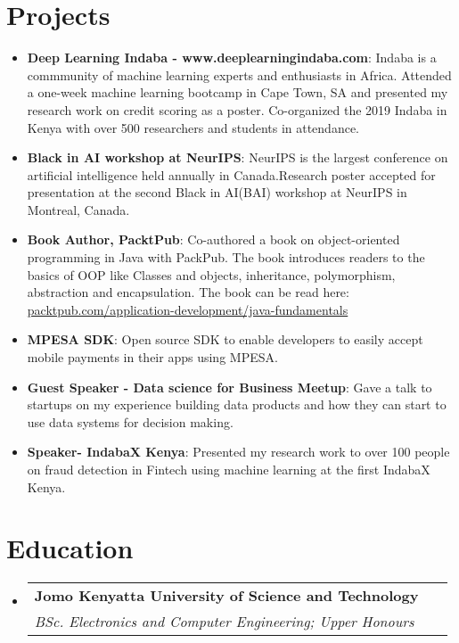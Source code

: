 \documentclass[letterpaper,11pt]{article}
\makeatletter
\newcommand{\resumeItem}[2]{
  \item\small{
    \textbf{#1}{: #2 \vspace{-2pt}}
  }
}
\newcommand{\resumeSubheading}[4]{
  \vspace{-1pt}\item
    \begin{tabular*}{0.97\textwidth}{l@{\extracolsep{\fill}}r}
      \textbf{#1} & #2 \\
      \textit{\small#3} & \textit{\small #4} \\
    \end{tabular*}\vspace{-5pt}
}
\newcommand{\resumeSubItem}[2]{\resumeItem{#1}{#2}\vspace{-4pt}}
\newcommand{\resumeSubHeadingListStart}{\begin{itemize}[leftmargin=*]}
\newcommand{\resumeSubHeadingListEnd}{\end{itemize}}
\makeatother
\begin{document}
\section{Projects}
  \resumeSubHeadingListStart
  	\resumeSubItem{Deep Learning Indaba - www.deeplearningindaba.com}
      {Indaba is a commmunity of machine learning experts and enthusiasts in Africa. Attended a one-week machine learning bootcamp in Cape Town, SA and presented my research work on credit scoring as a poster. Co-organized the 2019 Indaba in Kenya with over 500 researchers and students in attendance.}
  	\resumeSubItem{Black in AI workshop at NeurIPS}
      {NeurIPS is the largest conference on artificial intelligence held annually in Canada.Research poster accepted for presentation at the second Black in AI(BAI) workshop at NeurIPS in Montreal, Canada.}
  	\resumeSubItem{Book Author, PacktPub}
      {Co-authored a book on object-oriented programming in Java with PackPub. The book introduces readers to the basics of OOP like Classes and objects, inheritance, polymorphism, abstraction and encapsulation. The book can be read here:\href{https://www.packtpub.com/application-development/java-fundamentals}{ packtpub.com/application-development/java-fundamentals}}
    \resumeSubItem{MPESA SDK}
      {Open source SDK to enable developers to easily accept mobile payments in their apps using MPESA.}
    \resumeSubItem{Guest Speaker - Data science for Business Meetup}
      {Gave a talk to startups on my experience building data products and how they can start to use data systems for decision making.}
    \resumeSubItem{Speaker- IndabaX Kenya}
      {Presented my research work to over 100 people on fraud detection in Fintech using machine learning at the first IndabaX Kenya.}
  \resumeSubHeadingListEnd

\section{Education}
  \resumeSubHeadingListStart
    \resumeSubheading
      {Jomo Kenyatta University of Science and Technology}{}
      {BSc. Electronics and Computer Engineering; Upper Honours}
      \
  \resumeSubHeadingListEnd





\end{document}
